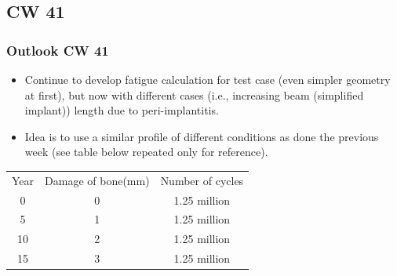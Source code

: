 \subsection{CW 41}
\begin{frame}
  \frametitle{Outlook CW 41}
	\begin{itemize}
		\item Continue to develop fatigue calculation for test case (even simpler geometry at first), but now with different cases (i.e., increasing beam (simplified implant)) length due to peri-implantitis. 
		\item Idea is to use a similar profile of different conditions as done the previous week (see table below repeated only for reference).
	\end{itemize}
	\begin{center}
	\begin{tabular}{|c|c|c|} 
 		\hline
 		Year & Damage of bone(mm) & Number of cycles\\ 
 		0  & 0 & 1.25 million \\ 
 		5  & 1 & 1.25 million \\ 
 		10 & 2 & 1.25 million \\ 
 		15 & 3 & 1.25 million \\ 
		\hline
	\end{tabular}
	\end{center}
\end{frame}

